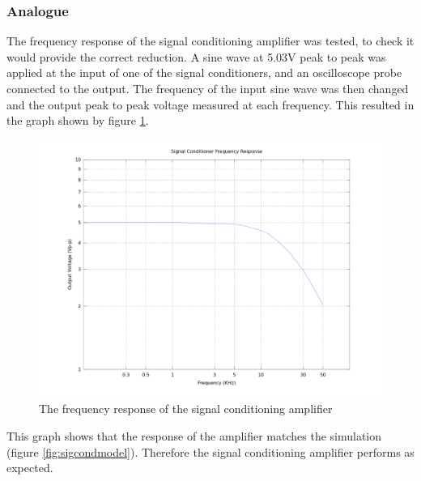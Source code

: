 \subsubsection{Analogue}
The frequency response of the signal conditioning amplifier was tested, to check it would provide the correct reduction.
A sine wave at 5.03V peak to peak was applied at the input of one of the signal conditioners, and an oscilloscope probe connected to the output.
The frequency of the input sine wave was then changed and the output peak to peak voltage measured at each frequency.
This resulted in the graph shown by figure \ref{fig:sigcondtest}.

\begin{figure}
	\centering
	\includegraphics[width=\textwidth]{./img/sigcondtest.png}
	\caption{The frequency response of the signal conditioning amplifier}
	\label{fig:sigcondtest}
\end{figure}

\noindent This graph shows that the response of the amplifier matches the simulation (figure \ref{fig:sigcondmodel}).
Therefore the signal conditioning amplifier performs as expected.
